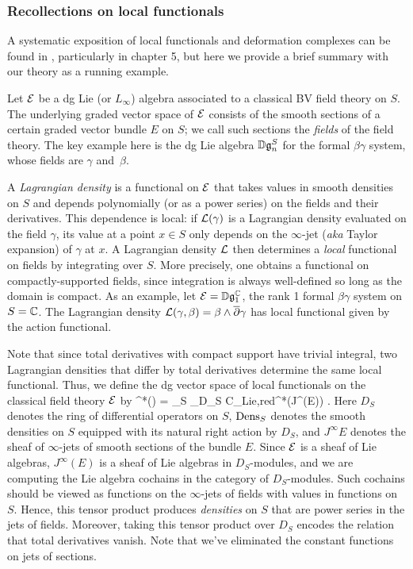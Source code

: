 \subsubsection{Recollections on local functionals}

A systematic exposition of local functionals and deformation complexes can be found in \cite{CosBook}, particularly in chapter 5,
but here we provide a brief summary with our theory as a running example. 

Let $\mathcal E$ be a dg Lie (or $L_\infty$) algebra associated to a classical BV field theory on $S$. 
The underlying graded vector space of $\mathcal E$ consists of the smooth sections of a certain graded vector bundle $E$ on $S$;
we call such sections the {\em fields} of the field theory.
The key example here is the dg Lie algebra $\mathbb D \mathfrak g_n^S$ for the formal $\beta\gamma$ system,
whose fields are $\gamma$ and~$\beta$.

A {\em Lagrangian density} is a functional on $\mathcal E$ that takes values in smooth densities on $S$ and depends polynomially (or as a power series) on the fields and their derivatives.
This dependence is local: if $\mathcal L(\gamma)$ is a Lagrangian density evaluated on the field $\gamma$, 
its value at a point $x \in S$ only depends on the $\infty$-jet ({\em aka} Taylor expansion) of $\gamma$ at $x$.
A Lagrangian density $\mathcal L$ then determines a {\em local} functional on fields by integrating over $S$.
More precisely, one obtains a functional on compactly-supported fields, since integration is always well-defined so long as the domain is compact.
As an example, let  $\mathcal E = \mathbb D\mathfrak g_1^\mathbb C$, the rank 1 formal $\beta\gamma$ system on $S = \mathbb C$.
The Lagrangian density $\mathcal L(\gamma,\beta) = \beta \wedge \overline{\partial} \gamma$
has local functional given by the action functional.

Note that since total derivatives with compact support have trivial integral,
two Lagrangian densities that differ by total derivatives determine the same local functional.
Thus, we  define the dg vector space of local functionals on the classical field theory $\mathcal E$ by
\ben
\cloc^*(\cE) = \Dens_S \tensor_{D_S} {\rm C}_{\rm Lie,red}^*(J^\infty(E)) . 
\een
Here $D_S$ denotes the ring of differential operators on $S$, 
${\rm Dens}_S$ denotes the smooth densities on $S$ equipped with its natural right action by $D_S$, 
and $J^\infty E$ denotes the sheaf of $\infty$-jets of smooth sections of the bundle $E$. 
Since $\mathcal E$ is a sheaf of Lie algebras, $J^\infty(E)$ is a sheaf of Lie algebras in $D_S$-modules,
and we are computing the Lie algebra cochains in the category of $D_S$-modules.
Such cochains should be viewed as functions on the $\infty$-jets of fields with values in functions on $S$.
Hence, this tensor product produces {\em densities} on $S$ that are power series in the jets of fields.
Moreover, taking this tensor product over $D_S$ encodes the relation that total derivatives vanish.
Note that we've eliminated the constant functions on jets of sections.

